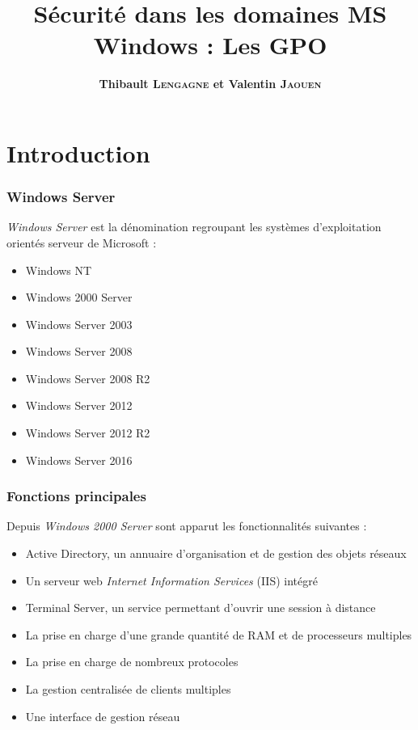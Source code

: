 \documentclass{beamer}
\title{Sécurité dans les domaines MS Windows : Les GPO}
\author{\textbf{Thibault \textsc{Lengagne} et Valentin \textsc{Jaouen}}}
\institute{Centrale Supélec - Campus de Rennes}
\begin{document}
  \begin{frame}
    \titlepage
  \end{frame}
  

  \section{Introduction}
  \begin{frame}
   \frametitle{Windows Server}
   \textit{Windows Server} est la dénomination regroupant les systèmes d'exploitation orientés serveur de Microsoft :
   \begin{itemize}
    \item Windows NT
    \item Windows 2000 Server
    \item Windows Server 2003
    \item Windows Server 2008
    \item Windows Server 2008 R2
    \item Windows Server 2012 
    \item Windows Server 2012 R2
    \item Windows Server 2016
   \end{itemize}
  \end{frame}
  
  \begin{frame}
   \frametitle{Fonctions principales}
   Depuis \textit{Windows 2000 Server} sont apparut les fonctionnalités suivantes :
   \begin{itemize}
    \item Active Directory, un annuaire d'organisation et de gestion des objets réseaux
    \item Un serveur web \textit{Internet Information Services} (IIS) intégré
    \item Terminal Server, un service permettant d'ouvrir une session à distance
    \item La prise en charge d'une grande quantité de RAM et de processeurs multiples
    \item La prise en charge de nombreux protocoles
    \item La gestion centralisée de clients multiples
    \item Une interface de gestion réseau
   \end{itemize}
  \end{frame}
\end{document}
